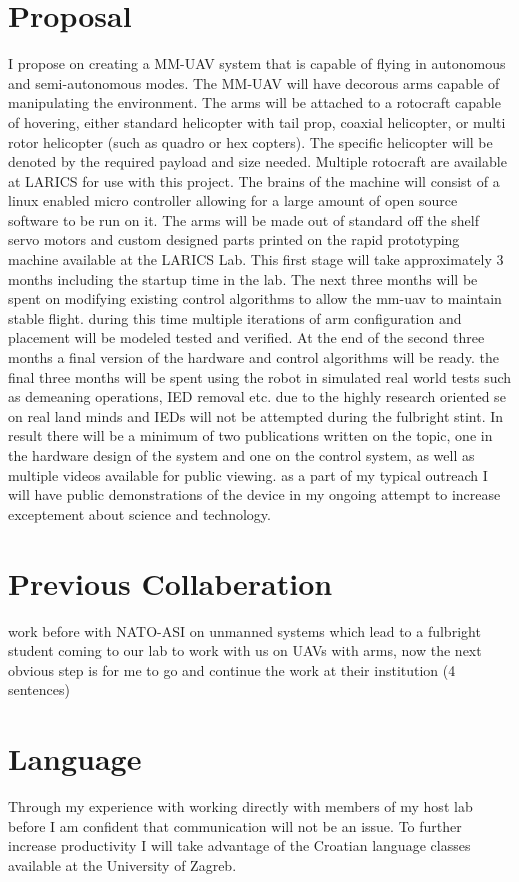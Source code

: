 \documentclass[12pt]{article}
\begin{document}
\section{Proposal}
I propose on creating a MM-UAV system that is capable of flying in autonomous and semi-autonomous 
modes.  The MM-UAV will have decorous arms capable of manipulating the environment.  The arms 
will be attached to a rotocraft capable of hovering, either standard helicopter with tail prop, coaxial 
helicopter, or multi rotor helicopter (such as quadro or hex copters).  The specific helicopter will be 
denoted by the required payload and size needed.  Multiple rotocraft are available at LARICS for use 
with this project.  The brains of the machine will consist of a linux enabled micro controller allowing for 
a large amount of open source software to be run on it.  The arms will be made out of standard off the 
shelf servo motors and custom designed parts printed on the rapid prototyping machine available at 
the LARICS Lab.  This first stage will take approximately 3 months including the startup time in the lab.  
The next three months will be spent on modifying existing control algorithms to allow the mm-uav to 
maintain stable flight.  during this time multiple iterations of arm configuration and placement will be 
modeled tested and verified.  At the end of the second three months a final version of the hardware and 
control algorithms will be ready.  the final three months will be spent using the robot in simulated real 
world tests such as demeaning operations, IED removal etc.  due to the highly research oriented se on 
real land minds and IEDs will not be attempted during the fulbright stint.  In result there will be a 
minimum of two publications written on the topic, one in the hardware design of the system and one on 
the control system, as well as multiple videos available for public viewing.  as a part of my typical 
outreach I will have public demonstrations of the device in my ongoing attempt to increase 
exceptement about science and technology.  

\section{Previous Collaberation}
work before with NATO-ASI on unmanned systems which lead to a fulbright student coming to our lab 
to work with us on UAVs with arms, now the next obvious step is for me to go and continue the work at 
their institution (4 sentences)

\section{Language}
Through my experience with working directly with members of my host lab before I am confident that communication will not be an issue.  To further increase productivity I will take advantage of the Croatian language classes available at the University of Zagreb.
\end{document}
